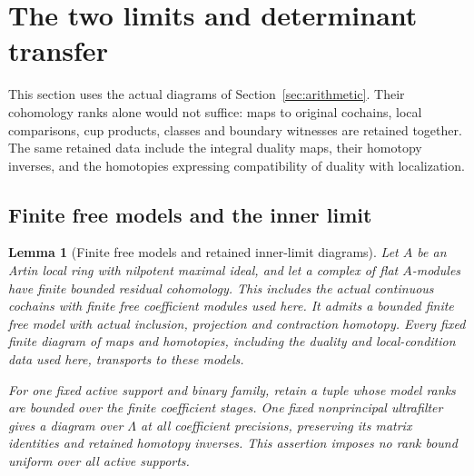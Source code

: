 \documentclass[11pt]{article}
\newtheorem{lemma}[theorem]{Lemma}
\theoremstyle{definition}
\theoremstyle{remark}
\begin{document}


\section{The two limits and determinant transfer}\label{sec:limits}
This section uses the actual diagrams of Section~\ref{sec:arithmetic}.
Their cohomology ranks alone would not suffice: maps to original
cochains, local comparisons, cup products, classes and boundary
witnesses are retained together. The same retained data include the
integral duality maps, their homotopy inverses, and the homotopies
expressing compatibility of duality with localization.

\subsection{Finite free models and the inner limit}
\begin{lemma}[Finite free models and retained inner-limit diagrams]\label{ex:limits-inner-limit}
Let $A$ be an Artin local ring with nilpotent maximal ideal, and
let a complex of flat $A$-modules have finite bounded residual
cohomology. This includes the actual continuous cochains with
finite free coefficient modules used here. It admits a bounded finite free model
with actual inclusion, projection and contraction homotopy.
Every fixed finite diagram of maps and homotopies, including the
duality and local-condition data used here, transports to these
models.

For one fixed active support and binary family, retain a tuple
whose model ranks are bounded over the finite coefficient stages.
One fixed nonprincipal ultrafilter gives a diagram over $\Lambda$
at all coefficient precisions, preserving its matrix identities
and retained homotopy inverses. This assertion imposes no rank
bound uniform over all active supports.
\end{lemma}
\end{document}
